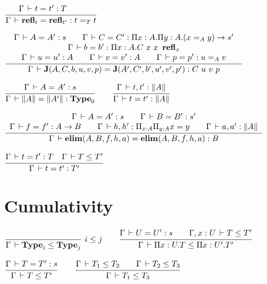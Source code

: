 \documentclass[a4paper,english]{lipics-utf8x}
\begin{document}
  \begin{center}
  \(
    \ru{\Gamma \der t = t' : T \qquad
      }{\Gamma \der \refl_t = \refl_{t'} : t =_T t}
  \)
  \end{center}

  \begin{center}
  \(
    \tru{\Gamma \der A = A' : s \qquad
         \Gamma \der C = C' : \Pi x:A. \Pi y:A. (x =_A y) \to s'
       }{\Gamma \der b = b' : \Pi x:A. C\ x\ x\ \refl_x
       }{\Gamma \der u = u' : A \qquad
         \Gamma \der v = v' : A \qquad
         \Gamma \der p = p' : u =_A v
       }{\Gamma \der \J (A,C,b,u,v,p) = \J (A',C',b',u',v',p') : C\ u\ v\ p}
  \)
  \end{center}

  \begin{center}
  \(
    \ru{\Gamma \der A = A' : s
      }{\Gamma \der \squash{A} = \squash{A'} : \Type_0}
    \qquad
    \ru{\Gamma \der t, t' : \squash{A}
      }{\Gamma \der t = t' : \squash{A}}
  \)
  \end{center}

  \begin{center}
  \(
    \dru{\Gamma \der A = A' : s \qquad
         \Gamma \der B = B' : s'
       }{\Gamma \der f = f' : A \to B \qquad
         \Gamma \der h, h' : \Pi_{x:A} \Pi_{y:A} x = y \qquad
         \Gamma \der a, a' : \squash{A}
       }{\Gamma \der \elim(A,B,f,h,a) = \elim(A,B,f,h,a) : B}
  \)
  \end{center}


  \begin{center}
  \(
    \ru{\Gamma \der t = t' : T \quad
        \Gamma \der T \le T'
      }{\Gamma \der t = t' : T'}
  \)
  \end{center}

  \section{Cumulativity}

  \begin{center}
  \(
    \rux{}{\Gamma \der \Type_i \le \Type_j}{i \le j}
    \qquad
    \ru{\Gamma \der U = U' : s \qquad
        \Gamma, x:U \der T \le T'
      }{\Gamma \der \Pi x:U.T \le \Pi x:U'.T'}
  \)
  \end{center}

  \begin{center}
  \(
    \ru{\Gamma \der T = T' : s
      }{\Gamma \der T \le T'}
    \qquad
    \ru{\Gamma \der T_1 \le T_2 \qquad
        \Gamma \der T_2 \le T_3
      }{\Gamma \der T_1 \le T_3}
  \)
  \end{center}
\end{document}
